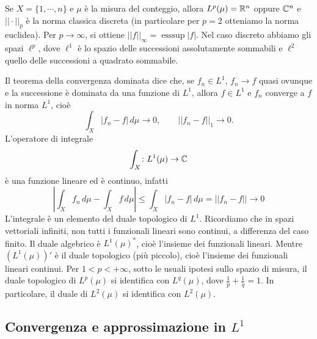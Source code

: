 \documentclass[a4paper]{article}
\begin{document}
\begin{radioactive}
Se \(X = \{1, \cdots, n\}\)
e \(\mu\) è la misura del conteggio, allora \(L^p(\mu) = \mathbb{R}^n\)
oppure \(\mathbb{C}^n\) e \(||\cdot||_p\)
è la norma classica discreta (in particolare per \(p=2\) otteniamo la norma euclidea).
Per \(p \to \infty\), si ottiene \(||f||_\infty = \operatorname{ess sup}|f|\).
Nel caso discreto abbiamo gli spazi \(\ell^p\), dove \(\ell^1\) è lo spazio delle successioni assolutamente sommabili e \(\ell^2\) quello delle successioni a quadrato sommabile.
\end{radioactive}

\begin{radioactive}
Il teorema della convergenza dominata dice che, se \(f_n \in L^1\),
\(f_n \to f\) quasi ovunque e la successione è dominata da una funzione di \(L^1\),
allora \(f \in L^1\) e \(f_n\) converge a \(f\) in norma \(L^1\), cioè
\[
    \int_X |f_n-f|\,d\mu \to 0, \qquad ||f_n-f||_1 \to 0.
\]
L'operatore di integrale \[
    \int_X \colon L^1(\mu) \to \mathbb{C}
\]
è una funzione lineare ed è continuo, infatti
\[
    \left|
    \int_X f_n\,d\mu - \int_X f\,d\mu
    \right|
    \leq \int_X |f_n - f|\,d\mu = ||f_n- f|| \to 0
\]
L'integrale è un elemento del duale topologico di \(L^1\).
Ricordiamo che in spazi vettoriali infiniti, non tutti i funzionali lineari sono continui,
a differenza del caso finito.
Il duale algebrico è \(L^1(\mu)^*\), cioè l'insieme dei funzionali lineari.
Mentre \((L^1(\mu))'\) è il duale topologico (più piccolo),
cioè l'insieme dei funzionali lineari continui.
Per \(1<p<+\infty\), sotto le usuali ipotesi sullo spazio di misura, il duale topologico di \(L^p(\mu)\)
si identifica con \(L^q(\mu)\), dove \(\frac1p+\frac1q=1\).
In particolare, il duale di \(L^2(\mu)\) si identifica con \(L^2(\mu)\).
\end{radioactive}

\subsection{Convergenza e approssimazione in \(L^1\)}
\end{document}
